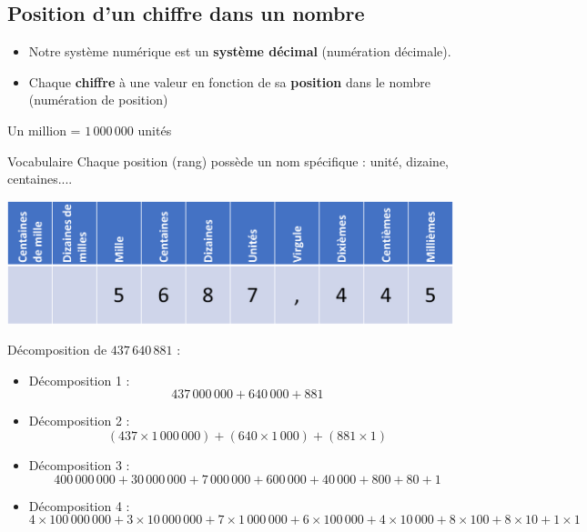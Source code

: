 \begin{pageCours}
\section{Position d'un chiffre dans un nombre}

\begin{Def}
\begin{itemize}
\item Notre système numérique est un \textbf{système décimal} (numération décimale).
\item Chaque \textbf{chiffre} à une valeur en fonction de sa \textbf{position} dans le nombre (numération de position)
\end{itemize}
\end{Def}

\begin{Ex}
Un million = $1\,000\,000$ unités
\end{Ex}

\begin{DefT}{Vocabulaire}
Chaque position (rang) possède un nom spécifique : unité, dizaine, centaines....
    
\begin{center}
    \includegraphics[width=13cm]{FIG/tableau_position.png}
\end{center}
\end{DefT}

\begin{Mt}
Décomposition de $437\,640\,881$ :
\begin{itemize}
\item Décomposition 1 : 
\[437\,000\,000+640\,000+881\]
\item Décomposition 2 :
\[(437\times1\,000\,000)+(640\times 1\,000)+(881\times1)\]
\item Décomposition 3 :
\[400\,000\,000+30\,000\,000+7\,000\,000+600\,000+40\,000+800+80+1\]
\item Décomposition 4 :
\[4\times100\,000\,000+3\times10\,000\,000+7\times1\,000\,000+6\times100\,000+4\times10\,000+8\times100+8\times10+1\times1\]
\end{itemize}
\end{Mt}


\end{pageCours}
